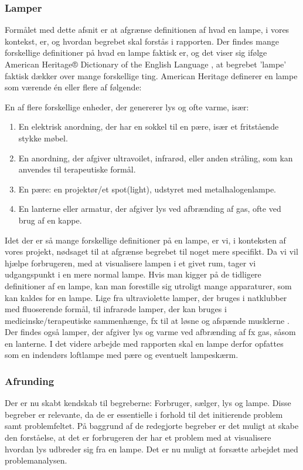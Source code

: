 \subsubsection{Lamper}
Formålet med dette afsnit er at afgrænse definitionen af hvad en lampe, i vores kontekst, er, og hvordan begrebet skal forstås i rapporten.
Der findes mange forskellige definitioner på hvad en lampe faktisk er, og det viser sig ifølge American Heritage® Dictionary of the English Language \cite{american_heritage}, at begrebet ’lampe’ faktisk dækker over mange forskellige ting. 
\newline American Heritage definerer en lampe som værende én eller flere af følgende:

En af flere forskellige enheder, der genererer lys og ofte varme, især:
\begin{enumerate}
    \item En elektrisk anordning, der har en sokkel til en pære, især et fritstående stykke møbel.
    \item En anordning, der afgiver ultravoilet, infrarød, eller anden stråling, som kan anvendes til terapeutiske formål.
    \item En pære: en projektør/et spot(light), udstyret med metalhalogenlampe.
    \item En lanterne eller armatur, der afgiver lys ved afbrænding af gas, ofte ved brug af en kappe.
\end{enumerate}

Idet der er så mange forskellige definitioner på en lampe, er vi, i konteksten af vores projekt, nødsaget til at afgrænse begrebet til noget mere specifikt. Da vi vil hjælpe forbrugeren, med at visualisere lampen i et givet rum, tager vi udgangspunkt i en mere normal lampe. Hvis man kigger på de tidligere definitioner af en lampe, kan man forestille sig utroligt mange apparaturer, som kan kaldes for en lampe. Lige fra ultraviolette lamper, der bruges i natklubber med fluoserende formål, til infrarøde lamper, der kan bruges i medicinske/terapeutiske sammenhænge, fx til at løsne og afspænde musklerne \cite{lys_terapi}. 
\newline Der findes også lamper, der afgiver lys og varme ved afbrænding af fx gas, såsom en lanterne. I det videre arbejde med rapporten skal en lampe derfor opfattes som en indendørs loftlampe med pære og eventuelt lampeskærm.  

\subsubsection{Afrunding}
Der er nu skabt kendskab til begreberne: Forbruger, sælger, lys og lampe. Disse begreber er relevante, da de er essentielle i forhold til det initierende problem samt problemfeltet. På baggrund af de redegjorte begreber er det muligt at skabe den forståelse, at det er forbrugeren der har et problem med at visualisere hvordan lys udbreder sig fra en lampe. 
\newline Det er nu muligt at forsætte arbejdet med problemanalysen.




